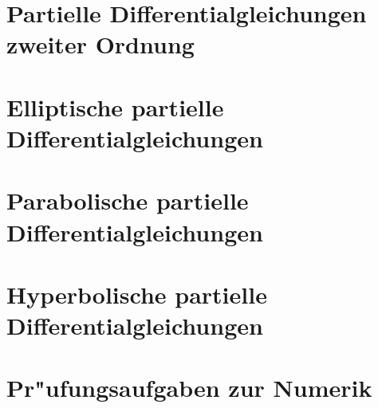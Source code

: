 \documentclass[a4paper,12pt]{book}
\begin{document}

\chapter{Partielle Differentialgleichungen zweiter Ordnung}

\chapter{Elliptische partielle Differentialgleichungen}

\chapter{Parabolische partielle Differentialgleichungen}

\chapter{Hyperbolische partielle Differentialgleichungen}

%
\chapter{Pr"ufungsaufgaben zur Numerik}

\end{document}
